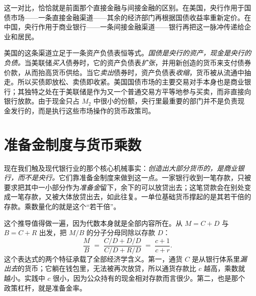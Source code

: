 这一对比，恰恰就是前面那个直接金融与间接金融的区别。在美国，央行作用于国债市场——一条直接金融渠道——其余的经济部门再根据国债收益率重新定价。在中国，央行作用于商业银行——一条间接金融渠道——银行再把这一脉冲传递给企业和居民。

美国的这条渠道立足于一条资产负债表恒等式。\emph{国债是央行的资产，现金是央行的负债。}当美联储\emph{买入}债券时，它的资产负债表\emph{扩张}，并用新创造的货币来支付债券价款，从而抬高货币供给。当它\emph{卖出}债券时，资产负债表\emph{收缩}，货币被从流通中抽走。所以买债即放松、卖债即收紧。美国国债市场的主要交易对手本身也是商业银行；其独特之处在于美联储是作为又一个普通交易方平等地参与买卖，而非直接向银行放款。由于现金只占 $M_2$ 中很小的份额，央行里最重要的部门并不是负责现金发行的，而是执行这些市场操作的货币政策司。

\section{准备金制度与货币乘数}

现在我们触及现代银行业的那个核心机械事实：\emph{创造出大部分货币的，是商业银行，而不是央行。}它们靠准备金制度来做到这一点。一家银行收到一笔存款，只被要求把其中一小部分作为\emph{准备金}留下，余下的可以放贷出去；这笔贷款会在别处变成一笔存款，又被大体放贷出去，如此往复。一单位基础货币撑起的是其若干倍的存款。乘数量化的就是这个“若干倍”。


这个推导值得做一遍，因为代数本身就是全部内容所在。从 $M = C + D$ 与 $B = C + R$ 出发，把 $M/B$ 的分子分母同除以存款 $D$：
\[
\frac{M}{B} \;=\; \frac{C/D + D/D}{C/D + R/D} \;=\; \frac{c + 1}{c + r}.
\]
这个表达式的两个特征承载了全部经济学含义。第一，通货 $C$ 是从银行体系里\emph{漏出去}的货币；它躺在钱包里，无法被再次放贷，所以通货存款比 $c$ 越高，乘数就越小。实践中 $c$ 很小，因为公众持有的现金相对存款而言很少。第二，也是那个政策杠杆，就是准备金率。


